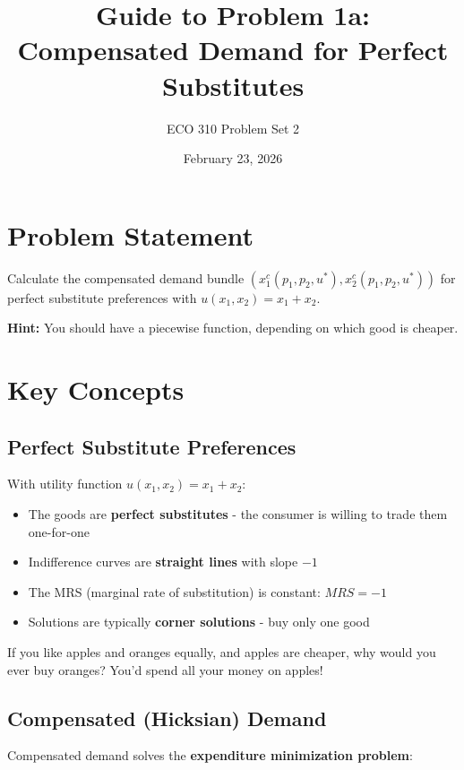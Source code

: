 \documentclass[11pt]{article}
\title{Guide to Problem 1a: Compensated Demand for Perfect Substitutes}
\author{ECO 310 Problem Set 2}
\date{February 23, 2026}
\begin{document}
\maketitle

\section{Problem Statement}

Calculate the compensated demand bundle $(x_1^c(p_1, p_2, u^*), x_2^c(p_1, p_2, u^*))$ for perfect substitute preferences with $u(x_1, x_2) = x_1 + x_2$.

\textbf{Hint:} You should have a piecewise function, depending on which good is cheaper.

\section{Key Concepts}

\subsection{Perfect Substitute Preferences}

With utility function $u(x_1, x_2) = x_1 + x_2$:

\begin{itemize}
\item The goods are \textbf{perfect substitutes} - the consumer is willing to trade them one-for-one
\item Indifference curves are \textbf{straight lines} with slope $-1$
\item The MRS (marginal rate of substitution) is constant: $MRS = -1$
\item Solutions are typically \textbf{corner solutions} - buy only one good
\end{itemize}

\begin{tcolorbox}[colback=blue!5!white,colframe=blue!75!black,title=Intuition]
If you like apples and oranges equally, and apples are cheaper, why would you ever buy oranges? You'd spend all your money on apples!
\end{tcolorbox}

\subsection{Compensated (Hicksian) Demand}

Compensated demand solves the \textbf{expenditure minimization problem}:
\end{document}
